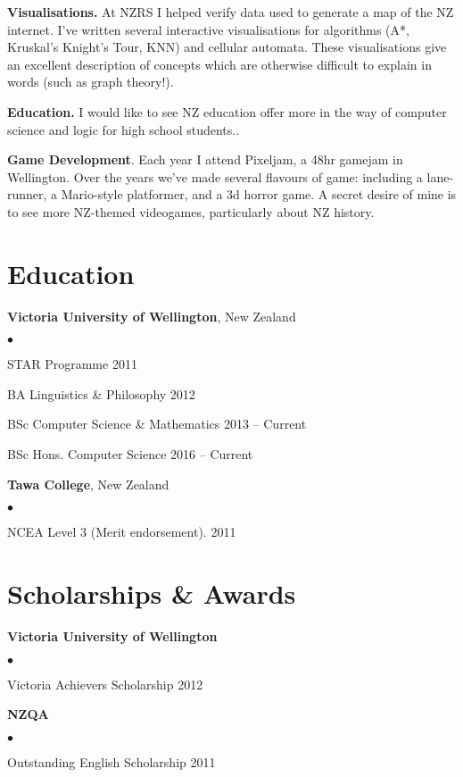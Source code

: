 \documentclass[margin,line]{res}
\newenvironment{list2}{
  \begin{list}{$\bullet$}{%
      \setlength{\itemsep}{0in}
      \setlength{\parsep}{0in} \setlength{\parskip}{0in}
      \setlength{\topsep}{0in} \setlength{\partopsep}{0in}
      \setlength{\leftmargin}{0.2in}}}
  {\end{list}}
\begin{document}
\begin{resume}
{\bf Visualisations.} At NZRS I helped verify data used to generate a map of the NZ internet. I've written several interactive visualisations for algorithms (A*, Kruskal's Knight's Tour, KNN) and cellular automata. These visualisations give an excellent description of concepts which are otherwise difficult to explain in words (such as graph theory!).

{\bf Education.} I would like to see NZ education offer more in the way of computer science and logic for high school students..

{\bf Game Development}. Each year I attend Pixeljam, a 48hr gamejam in Wellington. Over the years we've made several flavours of game: including a lane-runner, a Mario-style platformer, and a 3d horror game. A secret desire of mine is to see more NZ-themed videogames, particularly about NZ history.

\section{\sc Education}
{\bf Victoria University of Wellington}, New Zealand
\begin{list2}
	\item STAR Programme \hfill 2011
	\item BA Linguistics \& Philosophy \hfill 2012
	\item BSc Computer Science \& Mathematics \hfill 2013 -- Current
	\item BSc Hons. Computer Science \hfill 2016 -- Current
\end{list2}

{\bf Tawa College}, New Zealand
\begin{list2}
	\item NCEA Level 3 (Merit endorsement). \hfill 2011
\end{list2}

\section{\sc Scholarships \& Awards}

{\bf Victoria University of Wellington}
\begin{list2}
	\item Victoria Achievers Scholarship \hfill 2012
\end{list2}

{\bf NZQA}
\begin{list2}
	\item Outstanding English Scholarship \hfill 2011
\end{list2}


\end{resume}
\end{document}
